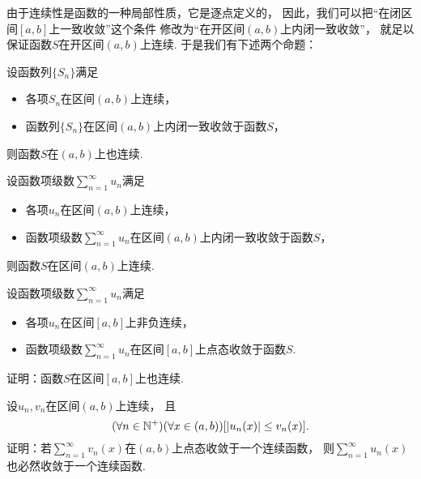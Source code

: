 由于连续性是函数的一种局部性质，它是逐点定义的，
因此，我们可以把“在闭区间\([a,b]\)上一致收敛”这个条件
修改为“在开区间\((a,b)\)上内闭一致收敛”，
就足以保证函数\(S\)在开区间\((a,b)\)上连续.
于是我们有下述两个命题：
\begin{proposition}\label{theorem:函数项级数.连续函数列的内闭一致收敛性保证极限函数的连续性}
设函数列\(\{S_n\}\)满足\begin{itemize}
	\item 各项\(S_n\)在区间\((a,b)\)上连续，
	\item 函数列\(\{S_n\}\)在区间\((a,b)\)上内闭一致收敛于函数\(S\)，
\end{itemize}
则函数\(S\)在\((a,b)\)上也连续.
\end{proposition}
\begin{proposition}\label{theorem:函数项级数.连续函数项级数的内闭一致收敛性保证和函数的连续性}
设函数项级数\(\sum_{n=1}^\infty u_n\)满足\begin{itemize}
	\item 各项\(u_n\)在区间\((a,b)\)上连续，
	\item 函数项级数\(\sum_{n=1}^\infty u_n\)在区间\((a,b)\)上内闭一致收敛于函数\(S\)，
\end{itemize}
则函数\(S\)在区间\((a,b)\)上连续.
\end{proposition}

\begin{example}
设函数项级数\(\sum_{n=1}^\infty u_n\)满足\begin{itemize}
	\item 各项\(u_n\)在区间\([a,b]\)上非负连续，
	\item 函数项级数\(\sum_{n=1}^\infty u_n\)在区间\([a,b]\)上点态收敛于函数\(S\).
\end{itemize}
证明：函数\(S\)在区间\([a,b]\)上也连续.
\end{example}

\begin{example}
设\(u_n,v_n\)在区间\((a,b)\)上连续，
且\[
	(\forall n\in\mathbb{N}^+)
	(\forall x\in(a,b))
	[\abs{u_n(x)} \leq v_n(x)].
\]
证明：若\(\sum_{n=1}^\infty v_n(x)\)在\((a,b)\)上点态收敛于一个连续函数，
则\(\sum_{n=1}^\infty u_n(x)\)也必然收敛于一个连续函数.
\end{example}

